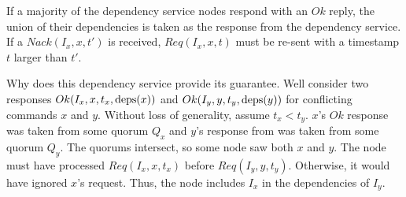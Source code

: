If a majority of the dependency service nodes respond with an $Ok$ reply, the
union of their dependencies is taken as the response from the dependency
service. If a $Nack(I_x, x, t')$ is received, $Req(I_x, x, t)$ must be re-sent
with a timestamp $t$ larger than $t'$.

Why does this dependency service provide its guarantee. Well consider two
responses $Ok(I_x, x, t_x, \text{deps}(x))$ and $Ok(I_y, y, t_y, \text{deps}(y))$ for
conflicting commands $x$ and $y$. Without loss of generality, assume $t_x <
t_y$. $x$'s $Ok$ response was taken from some quorum $Q_x$ and $y$'s response
from was taken from some quorum $Q_y$. The quorums intersect, so some node saw
both $x$ and $y$. The node must have processed $Req(I_x, x, t_x)$ before
$Req(I_y, y, t_y)$. Otherwise, it would have ignored $x$'s request. Thus, the
node includes $I_x$ in the dependencies of $I_y$.
